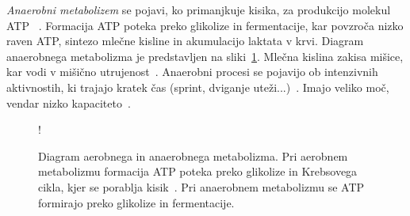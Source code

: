 \emph{Anaerobni metabolizem} se pojavi, ko primanjkuje kisika, za produkcijo molekul ATP ~\cite{patel2017aerobic}. Formacija ATP poteka preko glikolize in fermentacije, kar povzroča nizko raven ATP, sintezo mlečne kisline in akumulacijo laktata v krvi. Diagram anaerobnega metabolizma je predstavljen na sliki~\ref{fig:metabolism}. Mlečna kislina zakisa mišice, kar vodi v mišično utrujenost~\cite{sahlin1998energy}. Anaerobni procesi se pojavijo ob intenzivnih aktivnostih, ki trajajo kratek čas (sprint, dviganje uteži...)~\cite{patel2017aerobic}. Imajo  veliko moč, vendar nizko kapaciteto~\cite{sahlin1998energy}.


\begin{figure}[!htbp]
\centering
\resizebox {\columnwidth} {!}{

}
 \caption[Diagram aerobnega in anaerobnega metabolizma]{Diagram aerobnega in anaerobnega metabolizma. Pri aerobnem metabolizmu formacija ATP poteka preko glikolize in Krebsovega cikla, kjer se porablja kisik~\cite{scott2005misconceptions}. Pri anaerobnem metabolizmu se ATP formirajo preko glikolize in fermentacije.}
 \label{fig:metabolism}
\end{figure}
